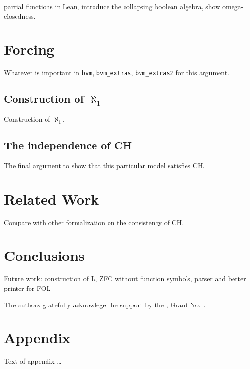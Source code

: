 \documentclass[sigplan,10pt,review]{acmart} %
\begin{document}
partial functions in Lean, introduce the collapsing boolean algebra, show omega-closedness.

\section{Forcing}
\label{section:forcing}
Whatever is important in \lstinline{bvm}, \lstinline{bvm_extras}, \lstinline{bvm_extras2} for this argument.

\subsection{Construction of $\aleph_1$}
\label{subsection:forcing:aleph-1}

Construction of $\aleph_1$.

\subsection{The independence of CH}
\label{subsection:forcing:independence}

The final argument to show that this particular model satisfies CH.

\section{Related Work}
\label{section:related-work}
Compare with other formalization on the consistency of CH.


\section{Conclusions}
\label{section:conclusions}
Future work: construction of L, ZFC without function symbols, parser and better printer for FOL

\begin{acks}                            %
  The authors gratefully acknowlege the support by the
  , Grant
  No.~.
\end{acks}





\appendix
\section{Appendix}

Text of appendix \ldots
\end{document}
